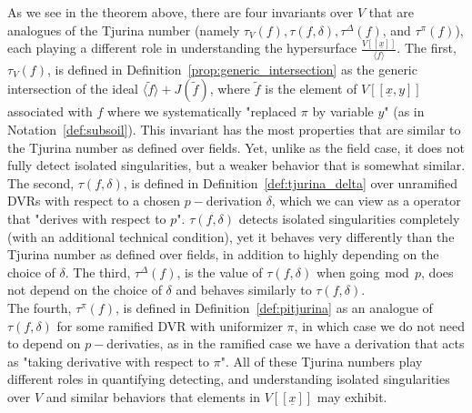 \documentclass{article}
\newcommand{\maxV}{\mathfrak{m}_V}
\newcommand{\Vx}{V[[\underline{x}]]}
\numberwithin{theorem}{section}
\renewcommand{\mod}{\,\operatorname{mod}\,}
\begin{document}
As we see in the theorem above, there are four invariants over $V$ that are analogues of the Tjurina number (namely $\tau_V(f), \tau(f, \delta), \tau^\Delta(f)$, and $\tau^\pi(f)$), each playing a different role in understanding the hypersurface $\frac{V[[\underline{x}]]}{\langle f \rangle}$. The first, $\tau_V(f)$, is defined in Definition~\ref{prop:generic_intersection} as the generic intersection of the ideal $\langle \tilde{f} \rangle + J(\tilde{f})$, where $\tilde{f}$ is the element of $V[[\underline{x},y]]$ associated with $f$ where we systematically "replaced $\pi$ by variable $y$" (as in Notation~\ref{def:subsoil}). This invariant has the most properties that are similar to the Tjurina number as defined over fields. Yet, unlike as the field case, it does not fully detect isolated singularities, but a weaker behavior that is somewhat similar. \\

The second, $\tau(f, \delta)$, is defined in Definition~\ref{def:tjurina_delta} over unramified DVRs with respect to a chosen $p-$derivation $\delta$, which we can view as a operator that "derives with respect to $p$". $\tau(f, \delta)$ detects isolated singularities completely (with an additional technical condition), yet it behaves very differently than the Tjurina number as defined over fields, in addition to highly depending on the choice of $\delta$. The third, $\tau^\Delta(f)$, is the value of $\tau(f, \delta)$ when going$\mod p$, does not depend on the choice of $\delta$ and behaves similarly to $\tau(f, \delta)$.\\

The fourth, $\tau^\pi(f)$, is defined in Definition~\ref{def:pitjurina} as an analogue of $\tau(f, \delta)$ for some ramified DVR with uniformizer $\pi$, in which case we do not need to depend on $p-$derivaties, as in the ramified case we have a derivation that acts as "taking derivative with respect to $\pi$". All of these Tjurina numbers play different roles in quantifying detecting, and understanding isolated singularities over $V$ and similar behaviors that elements in $V[[\underline{x}]]$ may exhibit. \\


\end{document}
